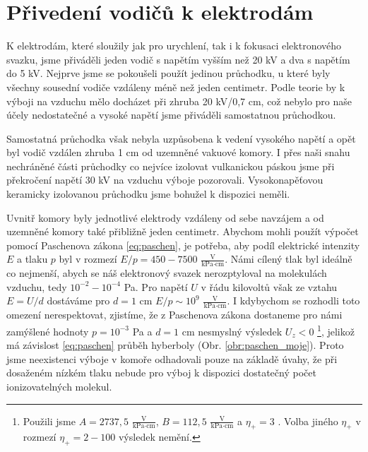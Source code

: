 \section{Přivedení vodičů k elektrodám}
\par K elektrodám, které sloužily jak pro urychlení, tak i k fokusaci elektronového svazku, jsme přiváděli jeden vodič s napětím vyšším než 20 kV a dva s napětím do 5 kV. Nejprve jsme se pokoušeli použít jedinou průchodku, u které byly všechny sousední vodiče vzdáleny méně než jeden centimetr. Podle teorie by k výboji na vzduchu mělo docházet při zhruba 20 kV/0,7 cm, což nebylo pro naše účely nedostatečné a vysoké napětí jsme přiváděli samostatnou průchodkou.
\par Samostatná průchodka však nebyla uzpůsobena k vedení vysokého napětí a opět byl vodič vzdálen zhruba 1 cm od uzemněné vakuové komory. I přes naši snahu nechráněné části průchodky co nejvíce izolovat vulkanickou páskou jsme při překročení napětí 30 kV na vzduchu výboje pozorovali. Vysokonapěťovou keramicky izolovanou průchodku jsme bohužel k dispozici neměli.
\par Uvnitř komory byly jednotlivé elektrody vzdáleny od sebe navzájem a od uzemněné komory také přibližně jeden centimetr. Abychom mohli použít výpočet pomocí Paschenova zákona \eqref{eq:paschen}, je potřeba, aby podíl elektrické intenzity $E$ a tlaku $p$ byl v rozmezí $E/p=450-7500$ $\frac{\text{V}}{\text{kPa} \cdot \text{cm}}$. Námi cílený tlak byl ideálně co nejmenší, abych se náš elektronový svazek nerozptyloval na molekulách vzduchu, tedy $10^{-2}-10^{-4}$ Pa. Pro napětí $U$ v řádu kilovoltů však ze vztahu $E=U/d$ dostáváme pro $d=1$ cm $E/p \sim 10^{9}$ $\frac{\text{V}}{\text{kPa} \cdot \text{cm}}$. I kdybychom se rozhodli toto omezení nerespektovat, zjistíme, že z Paschenova zákona dostaneme pro námi zamýšlené hodnoty $p=10^{-3}$ Pa a $d=1$ cm nesmyslný výsledek $U_z<0$ \footnote{Použili jsme $A=2737,5$ $\frac{\text{V}}{\text{kPa} \cdot \text{cm}}$, $B=112,5$ $\frac{\text{V}}{\text{kPa} \cdot \text{cm}}$ a $\eta_+=3$ \cite{Bozhko}. Volba jiného $\eta_+$ v rozmezí $\eta_+=2-100$ výsledek nemění.}, jelikož má závislost \eqref{eq:paschen} průběh hyberboly (Obr. \ref{obr:paschen_moje}).
Proto jsme neexistenci výboje v komoře odhadovali pouze na základě úvahy, že při dosaženém nízkém tlaku nebude pro výboj k dispozici dostatečný počet ionizovatelných molekul.



